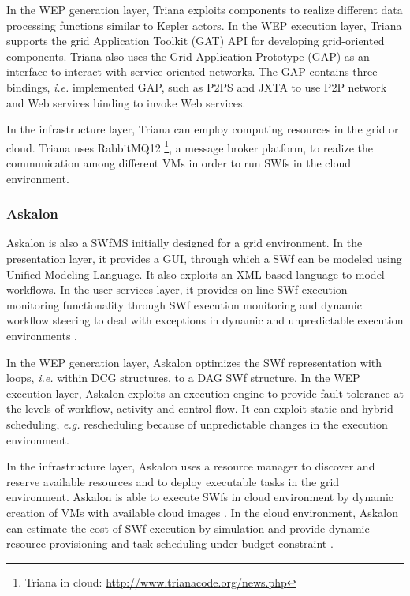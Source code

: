 In the WEP generation layer, Triana exploits components to realize different data 
processing functions similar to Kepler actors.  
In the WEP execution layer, Triana supports the grid Application Toolkit (GAT) API for developing grid-oriented 
components. Triana also uses the Grid Application Prototype (GAP) as an interface to interact 
with service-oriented networks. The GAP contains three bindings, \textit{i.e.} implemented GAP, such as P$2$PS and JXTA 
to use P$2$P network and Web services binding to invoke Web
services. 

In the infrastructure layer, Triana can employ computing resources in the grid or cloud.
Triana uses RabbitMQ12 \footnote{Triana in cloud: \url{http://www.trianacode.org/news.php}}, a message broker platform, to realize the communication among different VMs in order to run SWfs in the cloud environment.

\subsubsection{Askalon}
Askalon \cite{Fahringer2007} is also a SWfMS initially designed for a grid environment. 
In the presentation layer, it provides a GUI, through which a SWf can be modeled using Unified Modeling Language. It also exploits an XML-based language to model workflows.
In the user services layer, it provides on-line SWf execution monitoring functionality
through SWf execution monitoring and dynamic workflow steering to
deal with exceptions in dynamic and unpredictable execution environments
\cite{Prodan2007}.

In the WEP generation layer, Askalon optimizes the SWf representation with loops, \textit{i.e.} within DCG structures, to 
a DAG SWf structure. 
In the WEP execution layer, Askalon exploits an execution engine to provide fault-tolerance at the levels of workflow, activity and control-flow. 
It can exploit static and hybrid scheduling, \textit{e.g.} rescheduling because of unpredictable changes in the execution environment.

In the infrastructure layer, Askalon uses a resource manager to discover and reserve available resources and to deploy executable tasks in the grid environment. Askalon is able to execute SWfs in cloud environment by dynamic creation of VMs with available cloud images \cite{Ostermann2009a}.  In the cloud environment, Askalon can estimate the cost of SWf execution by simulation \cite{Ostermann2011} and provide dynamic resource provisioning and task scheduling under budget constraint \cite{Fard2013}. 

